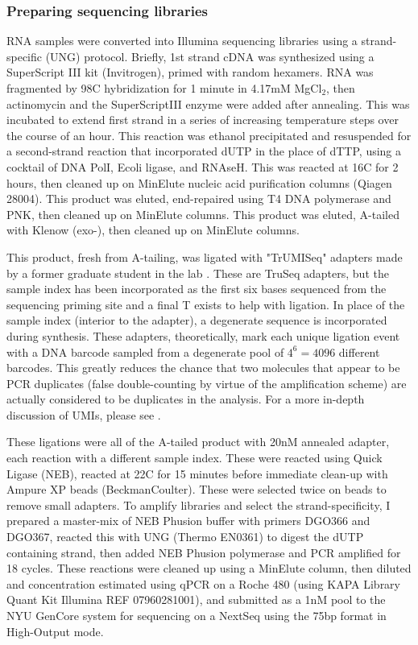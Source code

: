 \subsubsection{Preparing sequencing libraries}

RNA samples were converted into Illumina sequencing libraries using a
strand-specific (UNG) protocol.  Briefly, 1st strand cDNA was 
synthesized using a SuperScript III kit
(Invitrogen), primed with random hexamers. RNA was fragmented by
98C hybridization for 1 minute in 4.17mM MgCl$_2$, then actinomycin
and the SuperScriptIII enzyme were added after annealing.  
This was incubated to extend first strand in a series of increasing
temperature steps over the course of an hour.
This reaction was ethanol precipitated
and resuspended for a second-strand reaction that incorporated dUTP
in the place of dTTP, using a cocktail of DNA PolI, Ecoli ligase, and
RNAseH. This was reacted at 16C for 2 hours, then cleaned up on
MinElute nucleic acid purification columns (Qiagen 28004).
This product was eluted, end-repaired using T4 DNA polymerase and PNK,
then cleaned up on MinElute columns.
This product was eluted, A-tailed with Klenow (exo-), 
then cleaned up on MinElute columns.

This product, fresh from A-tailing, was ligated with "TrUMISeq"
adapters made by a former graduate student in the lab
\parencite{hong2017method}. These are TruSeq adapters, but the
sample index has been incorporated as the first six bases sequenced
from the sequencing priming site and a final T exists to help with
ligation. In place of the sample index (interior to the adapter),
a degenerate sequence is incorporated during synthesis.
These adapters, theoretically, mark each unique ligation event
with a DNA barcode sampled from a degenerate pool of $4^6 = 4096$
different barcodes. This greatly reduces the chance that two
molecules that appear to be PCR duplicates (false double-counting
by virtue of the amplification scheme) are actually considered
to be duplicates in the analysis. For a more in-depth discussion of
UMIs, please see
.

These ligations were all of the A-tailed product with 20nM annealed
adapter, each reaction with a different sample index. These were
reacted using Quick Ligase (NEB), reacted at 22C for 15 minutes
before immediate clean-up with Ampure XP beads (BeckmanCoulter).
These were selected twice on beads to remove small adapters.
To amplify libraries and select the strand-specificity, I prepared a
master-mix of NEB Phusion buffer with primers DGO366 and DGO367,
reacted this with UNG (Thermo EN0361) to digest the dUTP containing
strand, then added NEB Phusion polymerase and PCR amplified for
18 cycles.
These reactions were cleaned up using a MinElute column, then diluted
and concentration estimated using qPCR on a Roche 480 (using KAPA
Library Quant Kit Illumina REF 07960281001), and submitted as a 1nM pool
to the NYU GenCore system for sequencing on a NextSeq using the 75bp
format in High-Output mode.

